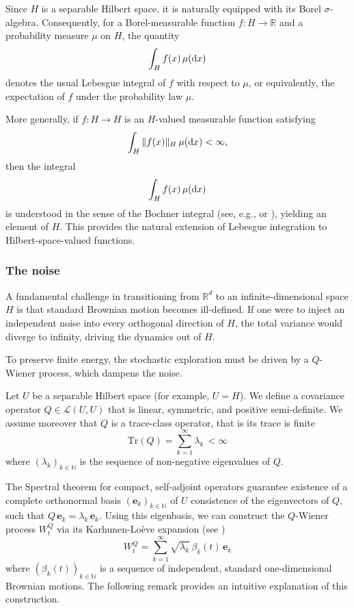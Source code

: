 \documentclass[12pt]{amsart}
\newcommand{\D}[1]{\mbox{\rm #1}}
\newcommand{\dd}{\D{d}}
\numberwithin{equation}{section}
\begin{document}
Since $H$ is a separable Hilbert space, it is naturally equipped with its Borel $\sigma$-algebra. Consequently, for a Borel-measurable function $f:H\to\mathbb{R}$ and a probability measure $\mu$ on $H$, the quantity
\[
    \int_H f(x)\,\mu(\dd x)
\]
denotes the usual Lebesgue integral of $f$ with respect to $\mu$, or equivalently, the expectation of $f$ under the probability law $\mu$. 

More generally, if $f:H\to H$ is an $H$-valued measurable function satisfying
\[
    \int_H \|f(x)\|_H\,\mu(\dd x)<\infty,
\]
then the integral
\[
    \int_H f(x)\,\mu(\dd x)
\]
is understood in the sense of the Bochner integral (see, e.g., \cite[Appendix A]{liu2015stochastic} or \cite[Appendix A]{prevot2007concise}), yielding an element of $H$. This provides the natural extension of Lebesgue integration to Hilbert-space-valued functions.

\subsubsection{The noise}
\label{subsec:q_wiener}

A fundamental challenge in transitioning from $\mathbb{R}^d$ to an infinite-dimensional space $H$ is that standard Brownian motion becomes ill-defined. If one were to inject an independent noise into every orthogonal direction of $H$, the total variance would diverge to infinity, driving the dynamics out of $H$.

To preserve finite energy, the stochastic exploration must be driven by a $Q$-Wiener process, which dampens the noise. 

Let $U$ be a separable Hilbert space (for example, $U=H$). We define a covariance operator $Q\in \mathscr{L}(U,U)$ that is linear, symmetric, and positive semi-definite. We assume moreover that $Q$ is a trace-class operator, that is its trace is finite
\begin{equation*}
    \mathrm{Tr}(Q) = \sum\limits_{k=1}^{\infty} \lambda_k \, < \infty
\end{equation*}
where $(\lambda_k)_{k\in \mathbb{N}}$ is the sequence of non-negative eigenvalues of $Q$. 

The Spectral theorem for compact, self-adjoint operators guarantee existence of a complete orthonormal basis $(\mathbf{e}_k)_{k\in\mathbb{N}}$ of $U$ consistence of the eigenvectors of $Q$, such that $Q\,\mathbf{e}_k = \lambda_k\,\mathbf{e}_k$. Using this eigenbasis, we can construct the $Q$-Wiener process $W_t^Q$ via its Karhunen-Lo\`{e}ve expansion (see \cite{alexanderian2015brief})
\begin{equation*}
    W_t^Q = \sum\limits_{k=1}^{\infty}\sqrt{\lambda_k}\,\beta_{k}(t)\,\mathbf{e}_k
\end{equation*}
where $(\beta_{k}(t))_{k\in\mathbb{N}}$ is a sequence of independent, standard one-dimensional Brownian motions. The following remark provides an intuitive explanation of this construction. 
\end{document}
